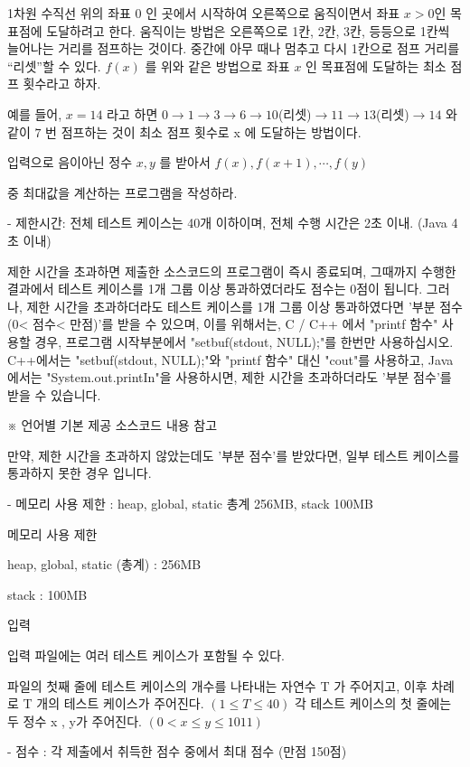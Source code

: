 \documentclass [12pt] {oblivoir}
\begin{document}
1차원 수직선 위의 좌표 0 인 곳에서 시작하여 오른쪽으로 움직이면서 좌표 $x>0$인 목표점에 도달하려고 한다.
움직이는 방법은 오른쪽으로 1칸, 2칸, 3칸, 등등으로 1칸씩 늘어나는 거리를 점프하는 것이다.
중간에 아무 때나 멈추고 다시 1칸으로 점프 거리를 “리셋”할 수 있다.
$f(x)$ 를 위와 같은 방법으로 좌표 $x$ 인 목표점에 도달하는 최소 점프 횟수라고 하자.

예를 들어, $x=14$ 라고 하면 $0 \rightarrow 1 \rightarrow 3 \rightarrow 6 \rightarrow 10$(리셋)$\rightarrow 11 \rightarrow 13$(리셋)$\rightarrow 14$ 와 같이 $7$ 번 점프하는 것이 최소 점프 횟수로 x 에 도달하는 방법이다.

입력으로 음이아닌 정수 $x, y$ 를 받아서 $f(x)  ,f(x+1) , \cdots , f(y)$

중 최대값을 계산하는 프로그램을 작성하라.

- 제한시간: 전체 테스트 케이스는 40개 이하이며, 전체 수행 시간은 2초 이내. (Java 4초 이내)

제한 시간을 초과하면 제출한 소스코드의 프로그램이 즉시 종료되며, 그때까지 수행한 결과에서 테스트 케이스를 1개 그룹 이상 통과하였더라도 점수는 0점이 됩니다.
그러나, 제한 시간을 초과하더라도 테스트 케이스를 1개 그룹 이상 통과하였다면 '부분 점수(0< 점수< 만점)'를 받을 수 있으며,
이를 위해서는, C / C++ 에서 "printf 함수" 사용할 경우, 프로그램 시작부분에서 "setbuf(stdout, NULL);"를 한번만 사용하십시오.
C++에서는 "setbuf(stdout, NULL);"와 "printf 함수" 대신 "cout"를 사용하고, Java에서는 "System.out.printIn"을 사용하시면,
제한 시간을 초과하더라도 '부분 점수'를 받을 수 있습니다.

※ 언어별 기본 제공 소스코드 내용 참고

만약, 제한 시간을 초과하지 않았는데도 '부분 점수'를 받았다면, 일부 테스트 케이스를 통과하지 못한 경우 입니다.

- 메모리 사용 제한 : heap, global, static 총계 256MB, stack 100MB

메모리 사용 제한

heap, global, static (총계) : 256MB

stack : 100MB

입력

입력 파일에는 여러 테스트 케이스가 포함될 수 있다.

파일의 첫째 줄에 테스트 케이스의 개수를 나타내는 자연수 T
가 주어지고,
이후 차례로  T 개의 테스트 케이스가 주어진다. $( 1 \le T \le 40 )$
각 테스트 케이스의 첫 줄에는 두 정수 x , y가 주어진다. $( 0 < x \le y \le 1011 )$

- 점수 : 각 제출에서 취득한 점수 중에서 최대 점수 (만점 150점)
\end{document}
